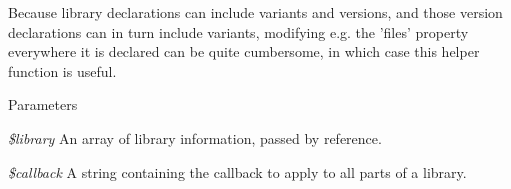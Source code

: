 Because library declarations can include variants and versions, and those version declarations can in turn include variants, modifying e.g. the 'files' property everywhere it is declared can be quite cumbersome, in which case this helper function is useful.


\begin{DoxyParams}{Parameters}
\item[{\em \$library}]An array of library information, passed by reference. \item[{\em \$callback}]A string containing the callback to apply to all parts of a library. \end{DoxyParams}
